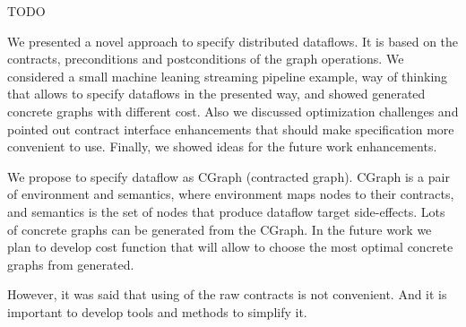 TODO

We presented a novel approach to specify distributed dataflows.
It is based on the contracts, preconditions and postconditions of the graph operations.
We considered a small machine leaning streaming pipeline example, way of thinking that allows to specify dataflows in the presented way, and showed generated concrete graphs with different cost.
Also we discussed optimization challenges and pointed out contract interface enhancements that should make specification more convenient to use.
Finally, we showed ideas for the future work enhancements.

We propose to specify dataflow as CGraph (contracted graph).
CGraph is a pair of environment and semantics, where environment maps nodes to their contracts, and semantics is the set of nodes that produce dataflow target side-effects.
Lots of concrete graphs can be generated from the CGraph.
In the future work we plan to develop cost function that will allow to choose the most optimal concrete graphs from generated.

However, it was said that using of the raw contracts is not convenient.
And it is important to develop tools and methods to simplify it.
